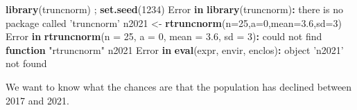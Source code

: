 \documentclass[]{book}
\newenvironment{Shaded}{\begin{snugshade}}{\end{snugshade}}
\newcommand{\ControlFlowTok}[1]{\textcolor[rgb]{0.13,0.29,0.53}{\textbf{#1}}}
\newcommand{\DataTypeTok}[1]{\textcolor[rgb]{0.13,0.29,0.53}{#1}}
\newcommand{\DecValTok}[1]{\textcolor[rgb]{0.00,0.00,0.81}{#1}}
\newcommand{\FloatTok}[1]{\textcolor[rgb]{0.00,0.00,0.81}{#1}}
\newcommand{\KeywordTok}[1]{\textcolor[rgb]{0.13,0.29,0.53}{\textbf{#1}}}
\newcommand{\NormalTok}[1]{#1}
\newcommand{\OperatorTok}[1]{\textcolor[rgb]{0.81,0.36,0.00}{\textbf{#1}}}
\newcommand{\StringTok}[1]{\textcolor[rgb]{0.31,0.60,0.02}{#1}}
\begin{document}
\begin{Shaded}
\begin{Highlighting}[]
\KeywordTok{library}\NormalTok{(truncnorm) ; }\KeywordTok{set.seed}\NormalTok{(}\DecValTok{1234}\NormalTok{)}
\NormalTok{Error }\ControlFlowTok{in} \KeywordTok{library}\NormalTok{(truncnorm)}\OperatorTok{:}\StringTok{ }\NormalTok{there is no package called }\StringTok{'truncnorm'}
\NormalTok{n2021 <-}\StringTok{ }\KeywordTok{rtruncnorm}\NormalTok{(}\DataTypeTok{n=}\DecValTok{25}\NormalTok{,}\DataTypeTok{a=}\DecValTok{0}\NormalTok{,}\DataTypeTok{mean=}\FloatTok{3.6}\NormalTok{,}\DataTypeTok{sd=}\DecValTok{3}\NormalTok{)}
\NormalTok{Error }\ControlFlowTok{in} \KeywordTok{rtruncnorm}\NormalTok{(}\DataTypeTok{n =} \DecValTok{25}\NormalTok{, }\DataTypeTok{a =} \DecValTok{0}\NormalTok{, }\DataTypeTok{mean =} \FloatTok{3.6}\NormalTok{, }\DataTypeTok{sd =} \DecValTok{3}\NormalTok{)}\OperatorTok{:}\StringTok{ }\NormalTok{could not find }\ControlFlowTok{function} \StringTok{"rtruncnorm"}
\NormalTok{n2021}
\NormalTok{Error }\ControlFlowTok{in} \KeywordTok{eval}\NormalTok{(expr, envir, enclos)}\OperatorTok{:}\StringTok{ }\NormalTok{object }\StringTok{'n2021'}\NormalTok{ not found}
\end{Highlighting}
\end{Shaded}

We want to know what the chances are that the population has declined between 2017 and 2021.

\begin{Shaded}
\end{Shaded}
\end{document}
